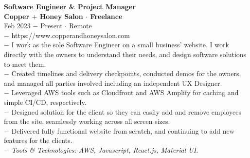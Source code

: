 \documentclass{resume}
\begin{document}
\begin{flushleft}
\normalsize{\bf Software Engineer \& Project Manager}\\
\footnotesize{\bf Copper $+$ Honey Salon $\cdot$ Freelance}\\
\footnotesize{Feb 2023 $-$ Present $\cdot$ Remote}\\[1mm]
{\scriptsize
	$-$ https://www.copperandhoneysalon.com\\
	$-$ I work as the sole Software Engineer on a small business' website. I work directly with the owners to understand their needs, and design software solutions to meet them.\\
	$-$ Created timelines and delivery checkpoints, conducted demos for the owners, and managed all parties involved including an independent UX Designer.\\
	$-$ Leveraged AWS tools such as Cloudfront and AWS Amplify for caching and simple CI/CD, respectively.\\
	$-$ Designed solution for the client so they can easily add and remove employees from the site, seamlessly working across all screen sizes.\\
	$-$ Delivered fully functional website from scratch, and continuing to add new features for the clients.\\
	$-$ \textit{Tools \& Technologies: AWS, Javascript, React.js, Material UI.}
}\\[3mm]


\end{flushleft}
\end{document}
